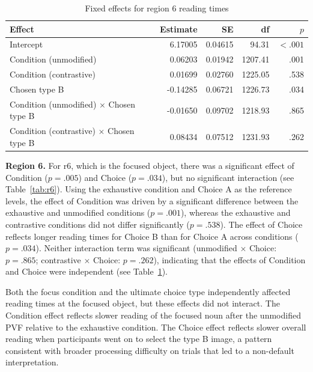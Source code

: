 \documentclass[a4paper, ruler]{CUP-JNL-LIN}%
\begin{document}
\begin{table}[htbp]
\centering
\caption{Fixed effects for region 6 reading times}
\label{tab:r6-fixed}
\begin{tabularx}{\textwidth}{@{}Xrrrr@{}}
\toprule
Effect & Estimate & SE & df & $p$ \\
\midrule
Intercept & 6.17005 & 0.04615 & 94.31 & $< .001$ \\
Condition (unmodified) & 0.06203 & 0.01942 & 1207.41 & .001 \\
Condition (contrastive) & 0.01699 & 0.02760 & 1225.05 & .538 \\
Chosen type B & -0.14285 & 0.06721 & 1226.73 & .034 \\
Condition (unmodified) $\times$ Chosen type B & -0.01650 & 0.09702 & 1218.93 & .865 \\
Condition (contrastive) $\times$ Chosen type B & 0.08434 & 0.07512 & 1231.93 & .262 \\
\bottomrule
\end{tabularx}
\end{table}


\noindent \textbf{Region 6.} For r6, which is the focused object, there was a significant effect of Condition ($p=.005$) and Choice ($p=.034$), but no significant interaction (see Table~\ref{tab:r6}). Using the exhaustive condition and Choice A as the reference levels, the effect of Condition was driven by a significant difference between the exhaustive and unmodified conditions ($p=.001$), whereas the exhaustive and contrastive conditions did not differ significantly ($p=.538$). The effect of Choice reflects longer reading times for Choice B than for Choice A across conditions ($p=.034$). Neither interaction term was significant (unmodified $\times$ Choice: $p=.865$; contrastive $\times$ Choice: $p=.262$), indicating that the effects of Condition and Choice were independent (see Table~\ref{tab:r6-fixed}).


Both the focus condition and the ultimate choice type independently affected reading times at the focused object, but these effects did not interact. The Condition effect reflects slower reading of the focused noun after the unmodified PVF relative to the exhaustive condition. The Choice effect reflects slower overall reading when participants went on to select the type B image, a pattern consistent with broader processing difficulty on trials that led to a non-default interpretation.
\end{document}
